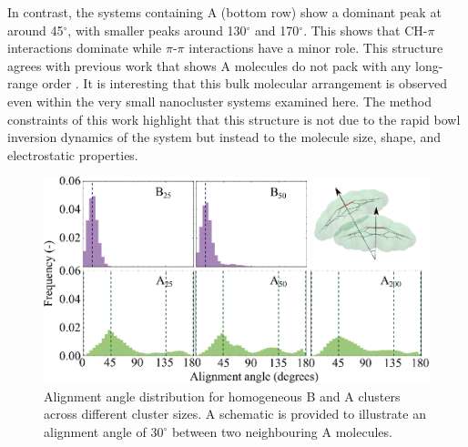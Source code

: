In contrast, the systems containing A (bottom row) show a dominant peak at around 45$^{\circ}$, with smaller peaks around 130$^{\circ}$ and 170$^{\circ}$. This shows that CH-$\pi$ interactions dominate while $\pi$-$\pi$ interactions have a minor role. This structure agrees with previous work that shows A molecules do not pack with any long-range order \cite{hanson1976crystal,Petrukhina2005,kanao2018differentiating,wang2015electronic,scott1999geodesic}. It is interesting that this bulk molecular arrangement is observed even within the very small nanocluster systems examined here. The method constraints of this work highlight that this structure is not due to the rapid bowl inversion dynamics of the system but instead to the molecule size, shape, and electrostatic properties.
%
\begin{figure}[!tbh]
\centering
\includegraphics[width=0.5\linewidth]{Figures/alignment_angles_homo.eps}
\caption{Alignment angle distribution for homogeneous B and A clusters across different cluster sizes. A schematic is provided to illustrate an alignment angle of $30^{\circ}$ between two neighbouring A molecules.}
\label{fig:alignmentangles_homo}
\end{figure}
%

